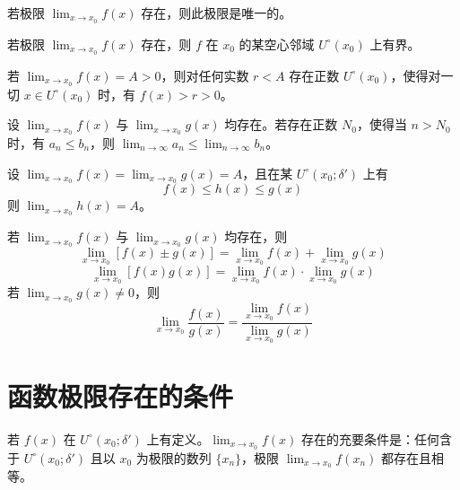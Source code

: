 \begin{theorem}[唯一性]
	若极限 $\displaystyle\lim_{x\to x_0}f(x)$ 存在，则此极限是唯一的。
\end{theorem}

\begin{theorem}[局部有界性]
	若极限 $\displaystyle\lim_{x\to x_0}f(x)$ 存在，则 $f$ 在 $x_0$ 的某空心邻域 $U^\circ(x_0)$ 上有界。
\end{theorem}

\begin{theorem}[保号性]
	若 $\displaystyle\lim_{x\to x_0}f(x) = A>0$，则对任何实数 $r<A$ 存在正数 $U^\circ(x_0)$，使得对一切 $x\in U^\circ(x_0)$ 时，有 $f(x)>r>0$。
\end{theorem}

\begin{theorem}[保不等式性]
	设 $\lim_{x\to x_0}f(x)$ 与 $\lim_{x\to x_0}g(x)$ 均存在。若存在正数 $N_0$，使得当 $n>N_0$ 时，有 $a_n\leqslant b_n$，则 $\displaystyle\lim_{n\to \infty}a_n \leqslant \lim_{n\to \infty}b_n$。
\end{theorem}

\begin{theorem}[迫敛性]
	设 $\lim_{x\to x_0}f(x) = \lim_{x\to x_0}g(x) = A$，且在某 $U^\circ(x_0;\delta')$ 上有
	$$f(x)\leqslant h(x) \leqslant g(x)$$
	则 $\lim_{x\to x_0}h(x) = A$。
\end{theorem}

\begin{theorem}[四则运算法则]
	若 $\displaystyle\lim_{x\to x_0}f(x)$ 与 $\displaystyle\lim_{x\to x_0}g(x)$ 均存在，则
	$$\lim_{x\to x_0}[f(x)\pm g(x)] = \lim_{x\to x_0}f(x) + \lim_{x\to x_0}g(x)$$
	$$\lim_{x\to x_0}[f(x)g(x)] = \lim_{x\to x_0}f(x) \cdot \lim_{x\to x_0}g(x)$$
	若 $\displaystyle\lim_{x\to x_0}g(x)\ne 0$，则
	$$\lim_{x\to x_0}\frac{f(x)}{g(x)} = \frac{\lim_{x\to x_0}f(x)}{\lim_{x\to x_0}g(x)}$$
\end{theorem}

\section{函数极限存在的条件}

\begin{theorem}
	若 $f(x)$ 在 $U^\circ(x_0;\delta')$ 上有定义。$\displaystyle\lim_{x\to x_0}f(x)$ 存在的充要条件是：任何含于 $U^\circ(x_0;\delta')$ 且以 $x_0$ 为极限的数列 $\{x_n\}$，极限 $\displaystyle\lim_{x\to x_0}f(x_n)$ 都存在且相等。
\end{theorem}

